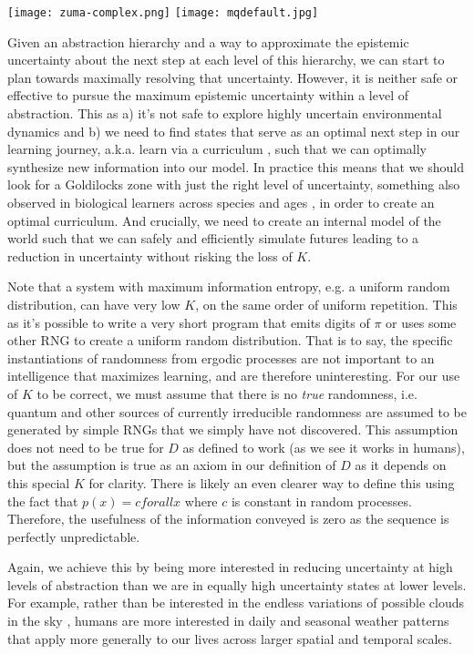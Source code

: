 \documentclass{article}
\begin{document}
\texttt{[image: zuma-complex.png]}
\texttt{[image: mqdefault.jpg]}

Given an abstraction hierarchy and a way to approximate the epistemic uncertainty about the next step at each level of this hierarchy, we can start to plan towards maximally resolving that uncertainty.  However, it is neither safe or effective to pursue the maximum epistemic uncertainty within a level of abstraction. This as a) it's not safe to explore highly uncertain environmental dynamics\cite{plappert2018multi} and b) we need to find states that serve as an optimal next step in our learning journey, a.k.a. learn via a curriculum \cite{bengio2009curriculum}, such that we can optimally synthesize new information into our model. In practice this means that we should look for a Goldilocks zone with just the right level of uncertainty, something also observed in biological learners across species and ages \cite{kidd2012goldilocks}, in order to create an optimal curriculum. And crucially, we need to create an internal model \cite{jang2023reflection} of the world such that we can safely and efficiently simulate futures leading to a reduction in uncertainty without risking the loss of $K$.

Note that a system with maximum information entropy, e.g. a uniform random distribution, can have very low $K$, on the same order of uniform repetition. This as it's possible to write a very short program that emits digits of $\pi$ or uses some other RNG to create a uniform random distribution.
That is to say, the specific instantiations of randomness from ergodic processes are not important to an intelligence that maximizes learning, and are therefore uninteresting. For our use of $K$ to be correct, we must assume that there is no \emph{true} randomness, i.e. quantum and other sources of currently irreducible randomness are assumed to be generated by simple RNGs that we simply have not discovered. This assumption does not need to be true for $D$ as defined to work (as we see it works in humans), but the assumption is true as an axiom in our definition of $D$ as it depends on this special $K$ for clarity. There is likely an even clearer way to define this using the fact that $p(x) = c for all x$  where $c$ is constant in random processes. Therefore, the usefulness of the information conveyed is zero as the sequence is perfectly unpredictable.

Again, we achieve this by being more interested in reducing uncertainty at high levels of abstraction than we are in equally high uncertainty states at lower levels. For example, rather than be interested in the endless variations of possible clouds in the sky \cite{alex-graves-vid},
humans are more interested in daily and seasonal weather patterns that apply more generally to our lives across larger spatial and temporal scales.
\end{document}
